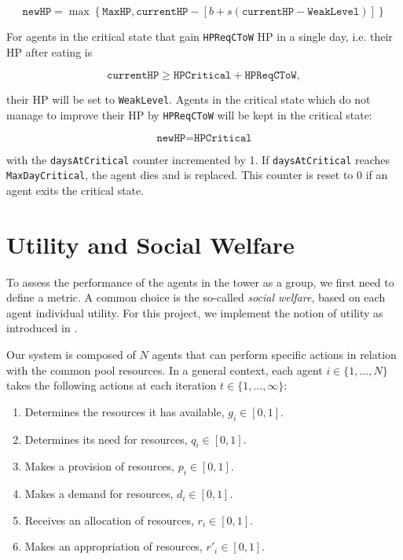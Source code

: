 \begin{equation}\label{hpDecay_bounded}
    \texttt{newHP} =\max\left\{\texttt{MaxHP}, \texttt{currentHP}-\left[b + s(\texttt{currentHP}-\texttt{WeakLevel})\right]\right\}
\end{equation}

For agents in the critical state that gain \texttt{HPReqCToW} HP in a single day, i.e. their HP after eating is

\begin{equation}\label{HPReqCToW}
    \texttt{currentHP} \geq \texttt{HPCritical}+\texttt{HPReqCToW},
\end{equation}

their HP will be set to \texttt{WeakLevel}. Agents in the critical state which do not manage to improve their HP by \lstinline$HPReqCToW$ will be kept in the critical state:

\begin{equation}\label{hpDecay_critical_stay}
    \texttt{newHP} = \texttt{HPCritical}
\end{equation}

with the \texttt{daysAtCritical} counter incremented by 1. If \texttt{daysAtCritical} reaches \texttt{MaxDayCritical}, the agent dies and is replaced. This counter is reset to 0 if an agent exits the critical state.




\section{Utility and Social Welfare}\label{utility}

To assess the performance of the agents in the tower as a group, we first need to define a metric. A common choice is the so-called \emph{social welfare}, based on each agent individual utility. For this project, we implement the notion of utility as introduced in \cite{somasPitt}.

Our system is composed of $N$ agents that can perform specific actions in relation with the common pool resources. In a general context, each agent 
$i\in\{1, \ldots, N\}$ takes the following actions at each iteration $t\in\{1,\ldots,\infty\}$:

\begin{enumerate}
    \item Determines the resources it has available, $g_i \in [0,1]$.
    \item Determines its need for resources, $q_i \in [0,1]$.
    \item Makes a provision of resources, $p_i \in [0,1]$.
    \item Makes a demand for resources, $d_i \in [0,1]$.
    \item Receives an allocation of resources, $r_i \in [0,1]$.
    \item Makes an appropriation of resources, $r'_i \in [0,1]$.
\end{enumerate}

